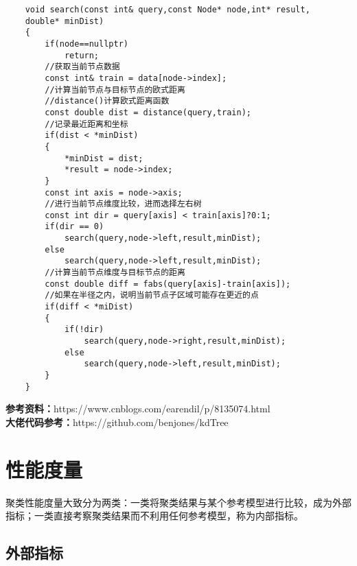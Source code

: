 \documentclass{article}
\begin{document}
	\begin{lstlisting}
	void search(const int& query,const Node* node,int* result,
	double* minDist)
	{
		if(node==nullptr)
			return;
		//获取当前节点数据
		const int& train = data[node->index];
		//计算当前节点与目标节点的欧式距离
		//distance()计算欧式距离函数
		const double dist = distance(query,train);
		//记录最近距离和坐标
		if(dist < *minDist)
		{
			*minDist = dist;
			*result = node->index;
		}
		const int axis = node->axis;
		//进行当前节点维度比较，进而选择左右树
		const int dir = query[axis] < train[axis]?0:1;
		if(dir == 0)
			search(query,node->left,result,minDist);
		else
			search(query,node->left,result,minDist);
		//计算当前节点维度与目标节点的距离
		const double diff = fabs(query[axis]-train[axis]);
		//如果在半径之内，说明当前节点子区域可能存在更近的点
		if(diff < *miDist)
		{
			if(!dir)
				search(query,node->right,result,minDist);
			else
				search(query,node->left,result,minDist);
		}
	}
	\end{lstlisting}
	\textbf{参考资料：}https://www.cnblogs.com/earendil/p/8135074.html\\
	\textbf{大佬代码参考：}https://github.com/benjones/kdTree
	
	\section{性能度量}
	聚类性能度量大致分为两类：一类将聚类结果与某个参考模型进行比较，成为外部指标；一类直接考察聚类结果而不利用任何参考模型，称为内部指标。
	\subsection{外部指标}
	
\end{document}
